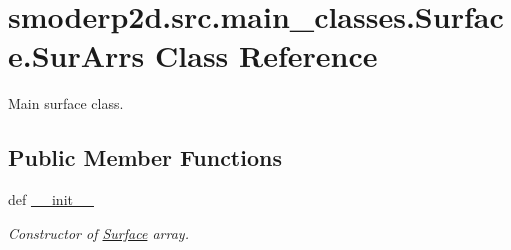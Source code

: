 \hypertarget{classsmoderp2d_1_1src_1_1main__classes_1_1Surface_1_1SurArrs}{\section{smoderp2d.\-src.\-main\-\_\-classes.\-Surface.\-Sur\-Arrs Class Reference}
\label{classsmoderp2d_1_1src_1_1main__classes_1_1Surface_1_1SurArrs}
}


Main surface class.  


\subsection*{Public Member Functions}
\begin{DoxyCompactItemize}
\item 
def \hyperlink{classsmoderp2d_1_1src_1_1main__classes_1_1Surface_1_1SurArrs_a6e477bb70aa8e6c937cb486a1c2b1ce8}{\-\_\-\-\_\-init\-\_\-\-\_\-}
\begin{DoxyCompactList}\small\item\em Constructor of \hyperlink{classsmoderp2d_1_1src_1_1main__classes_1_1Surface_1_1Surface}{Surface} array. \end{DoxyCompactList}\end{DoxyCompactItemize}
